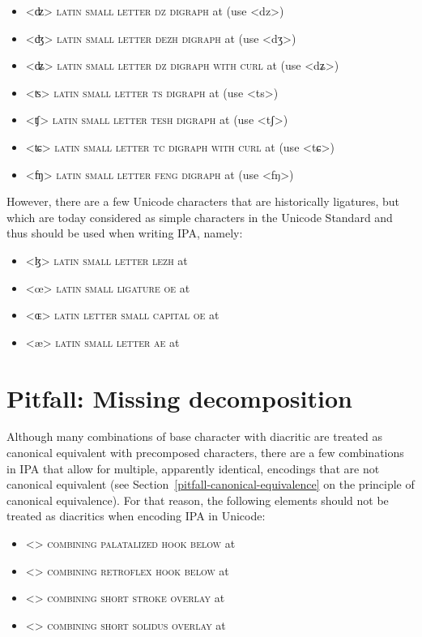 \begin{itemize} 
	\item[] <ʣ> \textsc{latin small letter dz digraph} at  
	  (use <dz>) 
    \item[] <ʤ> \textsc{latin small letter dezh digraph} at 
      (use <dʒ>)
    \item[] <ʥ> \textsc{latin small letter dz digraph with curl} at 
      (use <dʑ>)
    \item[] <ʦ> \textsc{latin small letter ts digraph} at  
      (use <ts>)
	\item[] <ʧ> \textsc{latin small letter tesh digraph} at  
	  (use <tʃ>) 
    \item[] <ʨ> \textsc{latin small letter tc digraph with curl} at 
      (use <tɕ>)
   	\item[] <ʩ> \textsc{latin small letter feng digraph} at 
	  (use <fŋ>) 
\end{itemize}

However, there are a few Unicode characters that are historically ligatures, but
which are today considered as simple characters in the Unicode Standard and thus
should be used when writing IPA, namely:

\begin{itemize}
	\item[] <ɮ> \textsc{latin small letter lezh} at  
	\item[] <œ> \textsc{latin small ligature oe} at  
	\item[] <ɶ> \textsc{latin letter small capital oe} at  
	\item[] <æ> \textsc{latin small letter ae} at  
\end{itemize}

\section{Pitfall: Missing decomposition}
\label{pitfall-missing-decomposition}

Although many combinations of base character with diacritic are treated as
canonical equivalent with precomposed characters, there are a few combinations
in IPA that allow for multiple, apparently identical, encodings that are not
canonical equivalent (see Section~\ref{pitfall-canonical-equivalence} on the
principle of canonical equivalence). For that reason, the following elements
should not be treated as diacritics when encoding IPA in Unicode:
\begin{itemize}
  \item[] <{}> \textsc{combining palatalized hook below} at 
  \item[] <{}> \textsc{combining retroflex hook below} at 
  \item[] <> \textsc{combining short stroke overlay} at 
  \item[] <> \textsc{combining short solidus overlay} at 
\end{itemize} 

